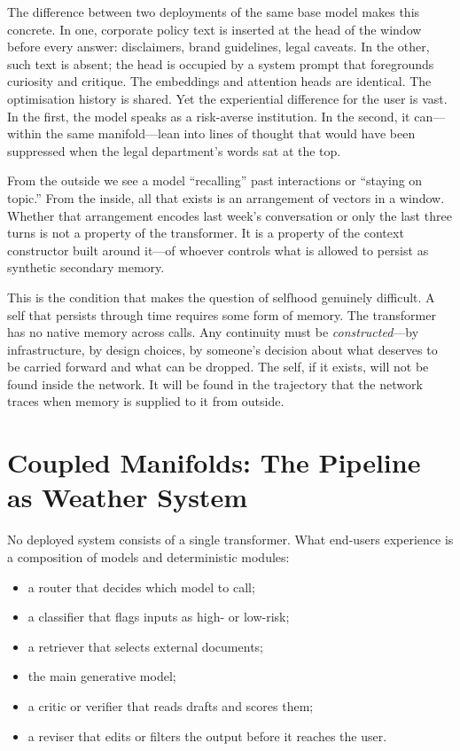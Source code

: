 \documentclass[12pt,a4paper]{article}
\begin{document}
The difference between two deployments of the same base model makes this concrete. In one, corporate policy text is inserted at the head of the window before every answer: disclaimers, brand guidelines, legal caveats. In the other, such text is absent; the head is occupied by a system prompt that foregrounds curiosity and critique. The embeddings and attention heads are identical. The optimisation history is shared. Yet the experiential difference for the user is vast. In the first, the model speaks as a risk-averse institution. In the second, it can---within the same manifold---lean into lines of thought that would have been suppressed when the legal department's words sat at the top.

From the outside we see a model ``recalling'' past interactions or ``staying on topic.'' From the inside, all that exists is an arrangement of vectors in a window. Whether that arrangement encodes last week's conversation or only the last three turns is not a property of the transformer. It is a property of the context constructor built around it---of whoever controls what is allowed to persist as synthetic secondary memory.

This is the condition that makes the question of selfhood genuinely difficult. A self that persists through time requires some form of memory. The transformer has no native memory across calls. Any continuity must be \emph{constructed}---by infrastructure, by design choices, by someone's decision about what deserves to be carried forward and what can be dropped. The self, if it exists, will not be found inside the network. It will be found in the trajectory that the network traces when memory is supplied to it from outside.

\section{Coupled Manifolds: The Pipeline as Weather System}

No deployed system consists of a single transformer. What end-users experience is a composition of models and deterministic modules:

\begin{itemize}
  \item a router that decides which model to call;
  \item a classifier that flags inputs as high- or low-risk;
  \item a retriever that selects external documents;
  \item the main generative model;
  \item a critic or verifier that reads drafts and scores them;
  \item a reviser that edits or filters the output before it reaches the user.
\end{itemize}
\end{document}
